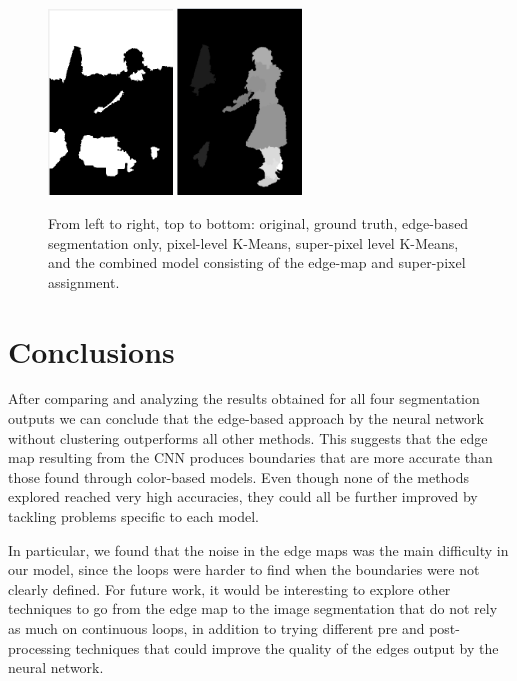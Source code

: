 \documentclass[10pt, twocolumn, twoside]{article}
\begin{document}
\begin{figure}[h]
    \includegraphics[width=1.3in]{images/supixel.png}
    \includegraphics[width=1.3in]{images/mix.png}

    \caption{From left to right, top to bottom: original, ground truth, edge-based segmentation only, pixel-level K-Means, super-pixel level K-Means, and the combined model consisting of the edge-map and super-pixel assignment.}
    \label{fig:reg38}
\end{figure}

\section{Conclusions}

After comparing and analyzing the results obtained for all four segmentation outputs we can conclude that the edge-based approach by the neural network without clustering outperforms all other methods. This suggests that the edge map resulting from the CNN produces boundaries that are more accurate than those found through color-based models. Even though none of the methods explored reached very high accuracies, they could all be further improved by tackling problems specific to each model.

In particular, we found that the noise in the edge maps was the main difficulty in our model, since the loops were harder to find when the boundaries were not clearly defined. For future work, it would be interesting to explore other techniques to go from the edge map to the image segmentation that do not rely as much on continuous loops, in addition to trying different pre and post-processing techniques that could improve the quality of the edges output by the neural network.
\end{document}
